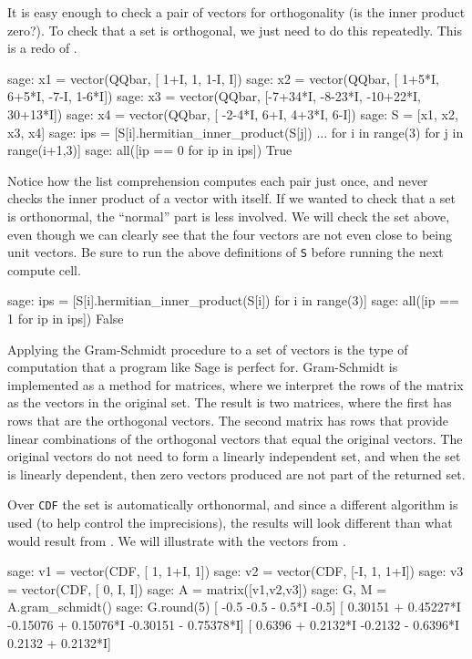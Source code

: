 It is easy enough to check a pair of vectors for orthogonality (is the inner product zero?).  To check that a set is orthogonal, we just need to do this repeatedly. This is a redo of .
%
\begin{sageexample}
sage: x1 = vector(QQbar, [    1+I,       1,      1-I,       I])
sage: x2 = vector(QQbar, [  1+5*I,   6+5*I,     -7-I,   1-6*I])
sage: x3 = vector(QQbar, [-7+34*I, -8-23*I, -10+22*I, 30+13*I])
sage: x4 = vector(QQbar, [ -2-4*I,     6+I,    4+3*I,     6-I])
sage: S = [x1, x2, x3, x4]
sage: ips = [S[i].hermitian_inner_product(S[j])
...                     for i in range(3) for j in range(i+1,3)]
sage: all([ip == 0 for ip in ips])
True
\end{sageexample}
%
Notice how the list comprehension computes each pair just once, and never checks the inner product of a vector with itself.  If we wanted to check that a set is orthonormal, the ``normal'' part is less involved.  We will check the set above, even though we can clearly see that the four vectors are not even close to being unit vectors.  Be sure to run the above definitions of \verb?S? before running the next compute cell.
%
\begin{sageexample}
sage: ips = [S[i].hermitian_inner_product(S[i]) for i in range(3)]
sage: all([ip == 1 for ip in ips])
False
\end{sageexample}
%
Applying the Gram-Schmidt procedure to a set of vectors is the type of computation that a program like Sage is perfect for.  Gram-Schmidt is implemented as a method for matrices, where we interpret the rows of the matrix as the vectors in the original set.  The result is two matrices, where the first has rows that are the orthogonal vectors.  The second matrix has rows that provide linear combinations of the orthogonal vectors that equal the original vectors.  The original vectors do not need to form a linearly independent set, and when the set is linearly dependent, then zero vectors produced are not part of the returned set.\par
%
Over \verb?CDF? the set is automatically orthonormal, and since a different algorithm is used (to help control the imprecisions), the results will look different than what would result from .  We will illustrate with the vectors from .
%
\begin{sageexample}
sage: v1 = vector(CDF, [ 1, 1+I,   1])
sage: v2 = vector(CDF, [-I,   1, 1+I])
sage: v3 = vector(CDF, [ 0,   I,   I])
sage: A = matrix([v1,v2,v3])
sage: G, M = A.gram_schmidt()
sage: G.round(5)
[                -0.5         -0.5 - 0.5*I                 -0.5]
[ 0.30151 + 0.45227*I -0.15076 + 0.15076*I -0.30151 - 0.75378*I]
[   0.6396 + 0.2132*I   -0.2132 - 0.6396*I    0.2132 + 0.2132*I]
\end{sageexample}

